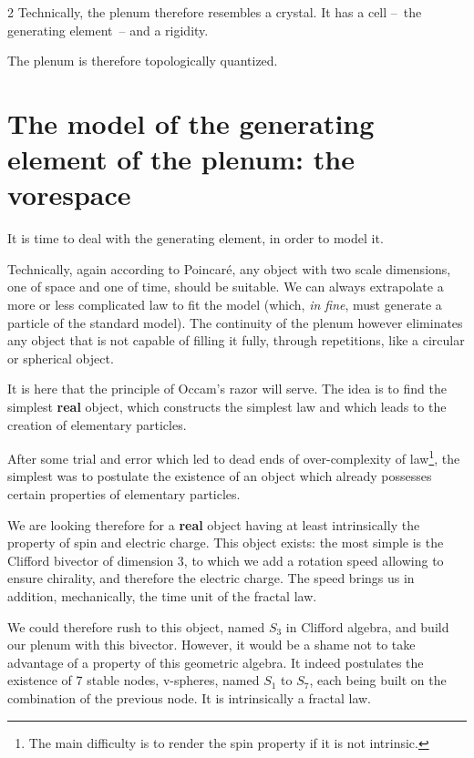\begin{multicols}{2}
	Technically, the plenum therefore resembles a crystal. It has a cell 
	--~the generating element~-- and a rigidity.
	
	The plenum is therefore topologically quantized.
	
	\section{The model of the generating element of the plenum: the vorespace}
	
	It is time to deal with the generating element, in order to 
	model it.
	
	Technically, again according to Poincaré, any object with two 
	scale dimensions, one of space and one of time, should be suitable. We 
	can always extrapolate a more or less complicated law 
	to fit the model (which, \textit{in fine}, must generate a particle of the 
	standard model). The continuity of the plenum however eliminates any object 
	that is not capable of filling it fully, through repetitions, like 
	a circular or spherical object.
	
	It is here that the principle of Occam's razor will serve. The idea is to find 
	the simplest \textbf{real} object, which constructs the simplest law and 
	which leads to the creation of elementary particles.
	
	After some trial and error which led to dead ends of 
	over-complexity of law\footnote{The main difficulty is to render 
		the spin property if it is not intrinsic.}, the simplest was 
	to postulate the existence of an object which already possesses certain 
	properties of elementary particles.
	
	We are looking therefore for a \textbf{real} object having at least intrinsically the 
	property of spin and electric charge. This object exists: the most 
	simple is the Clifford bivector of dimension 3, to which we add 
	a rotation speed allowing to ensure chirality, and therefore the 
	electric charge. The speed brings us in addition, mechanically, 
	the time unit of the fractal law.
	
	We could therefore rush to this object, named $S_3$ in 
	Clifford algebra, and build our plenum with this bivector. However, it would 
	be a shame not to take advantage of a property of this geometric 
	algebra. It indeed postulates the existence of 7 stable nodes, 
	v-spheres, named $S_1$ to $S_7$, each being built on the 
	combination of the previous node. It is intrinsically a 
	fractal law. 
	

\end{multicols}
